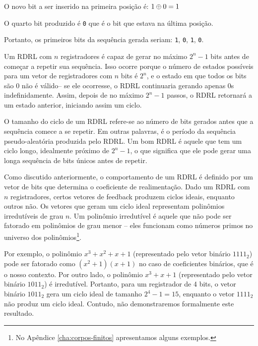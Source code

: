 \begin{example}
\begin{center}
\end{center}

O novo bit a ser inserido na primeira posição é: $1 \oplus 0 = 1$

O quarto bit produzido é {\tt 0} que é o bit que estava na última posição.

Portanto, os primeiros bits da sequência gerada seriam: {\tt 1}, {\tt 0}, {\tt 1}, {\tt 0}.

\end{example}


Um RDRL com $n$ registradores é capaz de gerar no máximo $2^n - 1$ bits antes de começar a repetir sua sequência.
Isso ocorre porque o número de estados possíveis para um vetor de registradores com $n$ bits é $2^n$, e o estado em que todos os bits são 0 não é válido-- se ele ocorresse, o RDRL continuaria gerando apenas 0s indefinidamente.
Assim, depois de no máximo $2^n - 1$ passos, o RDRL retornará a um estado anterior, iniciando assim um ciclo.

O tamanho do ciclo de um RDRL refere-se ao número de bits gerados antes que a sequência comece a se repetir.
Em outras palavras, é o período da sequência pseudo-aleatória produzida pelo RDRL.
Um bom RDRL é aquele que tem um ciclo longo, idealmente próximo de $2^n - 1$, o que significa que ele pode gerar uma longa sequência de bits únicos antes de repetir.

Como discutido anteriormente, o comportamento de um RDRL é definido por um vetor de bits que determina o coeficiente de realimentação.
Dado um RDRL com $n$ registradores, certos vetores de feedback produzem ciclos ideais, enquanto outros não.
Os vetores que geram um ciclo ideal representam polinômios irredutíveis de grau $n$.
Um polinômio irredutível é aquele que não pode ser fatorado em polinômios de grau menor -- eles funcionam como números primos no universo dos polinômios\footnote{No Apêndice \ref{cha:corpos-finitos} apresentamos alguns exemplos.}.

Por exemplo, o polinômio $x^3 + x^2 + x + 1$ (representado pelo vetor binário $1111_2$) pode ser fatorado como $(x^2 + 1)(x + 1)$ no caso de coeficientes binários, que é o nosso contexto.
Por outro lado, o polinômio $x^3 + x + 1$ (representado pelo vetor binário \(1011_2\)) é irredutível.
Portanto, para um registrador de 4 bits, o vetor binário $1011_2$ gera um ciclo ideal de tamanho $2^4 - 1 = 15$, enquanto o vetor $1111_2$ não produz um ciclo ideal.
Contudo, não demonstraremos formalmente este resultado. 

